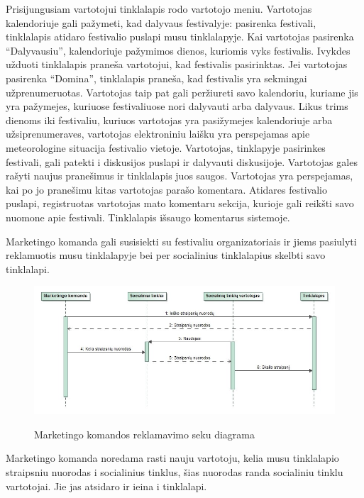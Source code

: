 ﻿\documentclass{VUMIFPSkursinis}
\begin{document}
Prisijungusiam vartotojui  tinklalapis rodo vartotojo meniu. Vartotojas kalendoriuje gali pažymeti, kad dalyvaus festivalyje: pasirenka festivali, tinklalapis atidaro festivalio puslapi musu tinklalapyje. Kai vartotojas pasirenka “Dalyvausiu”, kalendoriuje pažymimos dienos, kuriomis vyks festivalis. Ivykdes užduoti tinklalapis praneša vartotojui, kad festivalis pasirinktas. Jei vartotojas pasirenka “Domina”, tinklalapis praneša, kad festivalis yra sekmingai užprenumeruotas. Vartotojas taip pat gali peržiureti savo kalendoriu, kuriame jis yra pažymejes, kuriuose festivaliuose nori dalyvauti arba dalyvaus. Likus trims dienoms iki festivaliu, kuriuos vartotojas yra pasižymejes kalendoriuje arba užsiprenumeraves, vartotojas elektroniniu laišku yra perspejamas apie meteorologine situacija festivalio vietoje. Vartotojas, tinklapyje pasirinkes festivali, gali patekti i diskusijos puslapi ir dalyvauti diskusijoje. Vartotojas gales rašyti naujus pranešimus ir tinklalapis juos saugos. Vartotojas yra perspejamas, kai po jo pranešimu kitas vartotojas parašo komentara. Atidares festivalio puslapi, registruotas vartotojas mato komentaru sekcija, kurioje gali reikšti savo nuomone apie festivali. Tinklalapis išsaugo komentarus sistemoje.

Marketingo komanda gali susisiekti su festivaliu organizatoriais ir jiems pasiulyti reklamuotis musu tinklalapyje bei per socialinius tinklalapius skelbti savo tinklalapi.

\begin{figure}[H]
    \centering
    \includegraphics[scale=0.5]{img/geri/markfacebook}
    \label{img:uml26}
	\caption{Marketingo komandos reklamavimo seku diagrama}
\end{figure}

Marketingo komanda noredama rasti nauju vartotoju, kelia musu tinklalapio straipsniu nuorodas i socialinius tinklus, šias nuorodas randa socialiniu tinklu vartotojai. Jie jas atsidaro ir ieina i tinklalapi.
\end{document}
